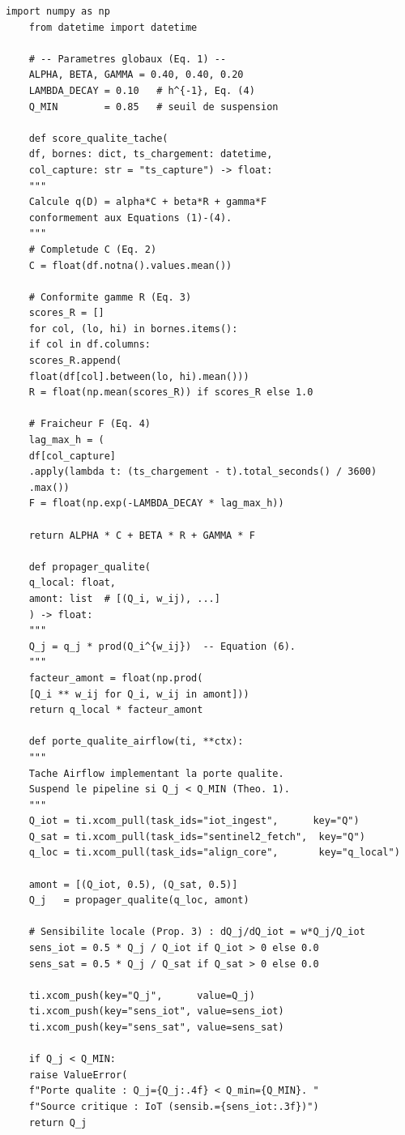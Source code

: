 \documentclass[12pt]{article}
\begin{document}
\begin{lstlisting}[caption={Porte qualite : calcul et propagation de $Q_j$},
	label={lst:qgate}]
	import numpy as np
	from datetime import datetime
	
	# -- Parametres globaux (Eq. 1) --
	ALPHA, BETA, GAMMA = 0.40, 0.40, 0.20
	LAMBDA_DECAY = 0.10   # h^{-1}, Eq. (4)
	Q_MIN        = 0.85   # seuil de suspension
	
	def score_qualite_tache(
	df, bornes: dict, ts_chargement: datetime,
	col_capture: str = "ts_capture") -> float:
	"""
	Calcule q(D) = alpha*C + beta*R + gamma*F
	conformement aux Equations (1)-(4).
	"""
	# Completude C (Eq. 2)
	C = float(df.notna().values.mean())
	
	# Conformite gamme R (Eq. 3)
	scores_R = []
	for col, (lo, hi) in bornes.items():
	if col in df.columns:
	scores_R.append(
	float(df[col].between(lo, hi).mean()))
	R = float(np.mean(scores_R)) if scores_R else 1.0
	
	# Fraicheur F (Eq. 4)
	lag_max_h = (
	df[col_capture]
	.apply(lambda t: (ts_chargement - t).total_seconds() / 3600)
	.max())
	F = float(np.exp(-LAMBDA_DECAY * lag_max_h))
	
	return ALPHA * C + BETA * R + GAMMA * F
	
	def propager_qualite(
	q_local: float,
	amont: list  # [(Q_i, w_ij), ...]
	) -> float:
	"""
	Q_j = q_j * prod(Q_i^{w_ij})  -- Equation (6).
	"""
	facteur_amont = float(np.prod(
	[Q_i ** w_ij for Q_i, w_ij in amont]))
	return q_local * facteur_amont
	
	def porte_qualite_airflow(ti, **ctx):
	"""
	Tache Airflow implementant la porte qualite.
	Suspend le pipeline si Q_j < Q_MIN (Theo. 1).
	"""
	Q_iot = ti.xcom_pull(task_ids="iot_ingest",      key="Q")
	Q_sat = ti.xcom_pull(task_ids="sentinel2_fetch",  key="Q")
	q_loc = ti.xcom_pull(task_ids="align_core",       key="q_local")
	
	amont = [(Q_iot, 0.5), (Q_sat, 0.5)]
	Q_j   = propager_qualite(q_loc, amont)
	
	# Sensibilite locale (Prop. 3) : dQ_j/dQ_iot = w*Q_j/Q_iot
	sens_iot = 0.5 * Q_j / Q_iot if Q_iot > 0 else 0.0
	sens_sat = 0.5 * Q_j / Q_sat if Q_sat > 0 else 0.0
	
	ti.xcom_push(key="Q_j",      value=Q_j)
	ti.xcom_push(key="sens_iot", value=sens_iot)
	ti.xcom_push(key="sens_sat", value=sens_sat)
	
	if Q_j < Q_MIN:
	raise ValueError(
	f"Porte qualite : Q_j={Q_j:.4f} < Q_min={Q_MIN}. "
	f"Source critique : IoT (sensib.={sens_iot:.3f})")
	return Q_j
\end{lstlisting}
\end{document}
